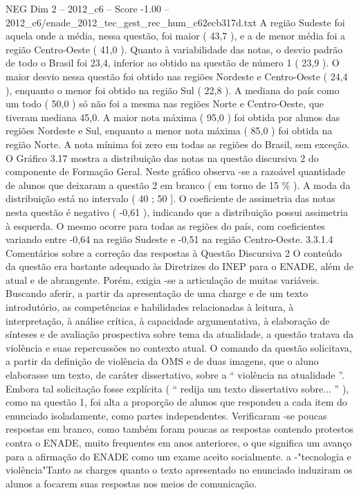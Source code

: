 \begin{textsample}{NEG Dim 2 – 2012\_c6 – Score -1.00 – 2012\_c6/enade\_2012\_tec\_gest\_rec\_hum\_c62ecb317d.txt}
A região Sudeste foi aquela onde a média, nessa questão, foi maior ( 43,7 ), e a de menor média foi a região Centro-Oeste ( 41,0 ).
Quanto à variabilidade das notas, o desvio padrão de todo o Brasil foi 23,4, inferior ao obtido na questão de número 1 ( 23,9 ).
O maior desvio nessa questão foi obtido nas regiões Nordeste e Centro-Oeste ( 24,4 ), enquanto o menor foi obtido na região Sul ( 22,8 ).
A mediana do país como um todo ( 50,0 ) só não foi a mesma nas regiões Norte e Centro-Oeste, que tiveram mediana 45,0.
A maior nota máxima ( 95,0 ) foi obtida por alunos das regiões Nordeste e Sul, enquanto a menor nota máxima ( 85,0 ) foi obtida na região Norte.
A nota mínima foi zero em todas as regiões do Brasil, sem exceção.
O Gráfico 3.17 mostra a distribuição das notas na questão discursiva 2 do componente de Formação Geral.
Neste gráfico observa -se a razoável quantidade de alunos que deixaram a questão 2 em branco ( em torno de 15 \% ).
A moda da distribuição está no intervalo ( 40 ; 50 ].
O coeficiente de assimetria das notas nesta questão é negativo ( -0,61 ), indicando que a distribuição possui assimetria à esquerda.
O mesmo ocorre para todas as regiões do país, com coeficientes variando entre -0,64 na região Sudeste e -0,51 na região Centro-Oeste. 3.3.1.4 Comentários sobre a correção das respostas à Questão Discursiva 2 O conteúdo da questão era bastante adequado às Diretrizes do INEP para o ENADE, além de atual e de abrangente.
Porém, exigia -se a articulação de muitas variáveis.
Buscando aferir, a partir da apresentação de uma charge e de um texto introdutório, as competências e habilidades relacionadas à leitura, à interpretação, à análise crítica, à capacidade argumentativa, à elaboração de sínteses e de avaliação prospectiva sobre tema da atualidade, a questão tratava da violência e suas repercussões no contexto atual.
O comando da questão solicitava, a partir da definição de violência da OMS e de duas imagens, que o aluno elaborasse um texto, de caráter dissertativo, sobre a “ violência na atualidade ”.
Embora tal solicitação fosse explícita ( “ redija um texto dissertativo sobre... ” ), como na questão 1, foi alta a proporção de alunos que respondeu a cada item do enunciado isoladamente, como partes independentes.
Verificaram -se poucas respostas em branco, como também foram poucas as respostas contendo protestos contra o ENADE, muito frequentes em anos anteriores, o que significa um avanço para a afirmação do ENADE como um exame aceito socialmente. a -"tecnologia e violência"Tanto as charges quanto o texto apresentado no enunciado induziram os alunos a focarem suas respostas nos meios de comunicação.

\end{textsample}
